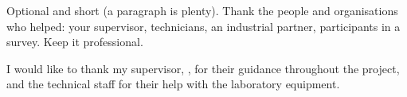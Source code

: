 
\begin{guidance}
Optional and short (a paragraph is plenty). Thank the people and
organisations who helped: your supervisor, technicians, an industrial
partner, participants in a survey. Keep it professional.
\end{guidance}

I would like to thank my supervisor, , for their guidance
throughout the project, and the technical staff for their help with the
laboratory equipment.
